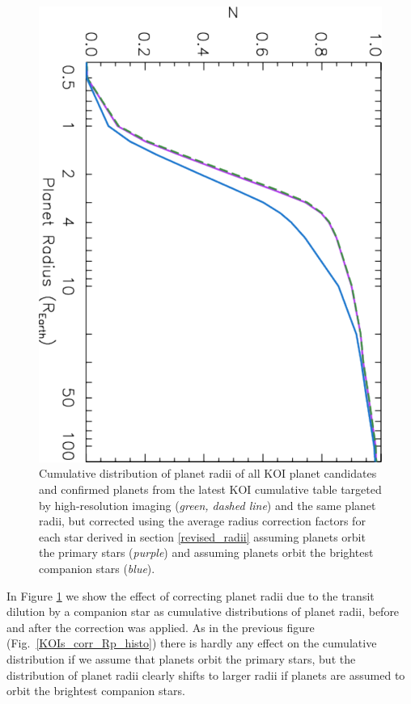 \documentclass[twocolumn,appendixfloats]{aastex6}
\begin{document}
\begin{figure}[!t]
\centering
\includegraphics[angle=90, scale=0.39]{KOI_obs_planets_corr_Prad_cumul.pdf}
\caption{Cumulative distribution of planet radii of all KOI planet candidates and 
confirmed planets from the latest KOI cumulative table targeted by high-resolution
imaging ({\it green, dashed line}) and the same planet radii, but corrected using 
the average radius correction factors for each star derived in section \ref{revised_radii} 
assuming planets orbit the primary stars ({\it purple}) and assuming planets orbit 
the brightest companion stars ({\it blue}).
\label{KOIs_corr_Rp_cumul}}
\end{figure}

In Figure \ref{KOIs_corr_Rp_cumul} we show the effect of correcting
planet radii due to the transit dilution by a companion star as 
cumulative distributions of planet radii, before and after the correction
was applied. As in the previous figure (Fig.\ \ref{KOIs_corr_Rp_histo})
there is hardly any effect on the cumulative distribution if we assume 
that planets orbit the primary stars, but the distribution of planet radii 
clearly shifts to larger radii if planets are assumed to orbit the brightest 
companion stars.
\end{document}
